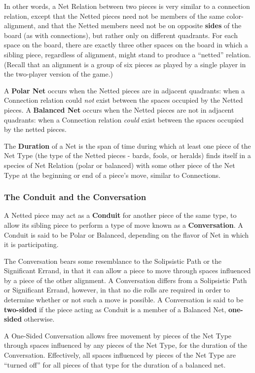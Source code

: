   In other words, a  Net Relation between two pieces is very similar to a
  connection relation, except that the Netted pieces need not be members
  of the same color-alignment, and that the Netted members need not be on opposite
  {\bf sides} of the board (as with connections), but rather only on different
  quadrants. For each space on the board, there are exactly three other
  spaces on the board in which a sibling piece, regardless of alignment,
  might stand to produce a ``netted'' relation.  (Recall that an alignment
  is a group of six pieces as played by a single player in the two-player
  version of the game.)

  A {\bf Polar Net} occurs when the Netted pieces are in adjacent quadrants: when
  a Connection relation could {\sl not} exist between the spaces occupied by the Netted
  pieces.  A {\bf Balanced Net} occurs when the Netted pieces are not in adjacent
  quadrants: when a Connection relation {\sl could} exist between the spaces occupied
  by the netted pieces.

  The {\bf Duration} of a Net is the span of time during which at least one piece of
  the Net Type (the type of the Netted pieces - bards, fools, or heralds) finds itself
  in a species of Net Relation (polar or balanced) with some other piece of the Net
  Type at the beginning or end of a piece's move, similar to Connections.

\subsubsection{The Conduit and the Conversation}\label{conduit}

  A Netted piece may act as a {\bf Conduit} for another piece of the same type, to
  allow its sibling piece to perform a type of move known as a {\bf Conversation}.
  A Conduit is said to be Polar or Balanced, depending on the flavor of Net in
  which it is participating.

  The Conversation bears some resemblance to the Solipsistic Path or the Significant
  Errand, in that it can allow a piece to move through spaces influenced by a 
  piece of the other alignment.  A Conversation differs from a Solipsistic Path or
  Significant Errand, however, in that no die rolls are required in order to
  determine whether or not such a move is possible.  A Conversation is said to be
  {\bf two-sided} if the piece acting as Conduit is a member of a Balanced Net,
  {\bf one-sided} otherwise.

  A One-Sided Conversation allows free movement by pieces of the Net Type 
  through spaces influenced by any pieces of the Net Type, for the duration of the
  Conversation.  Effectively, all spaces influenced by pieces of
  the Net Type are ``turned off'' for all pieces of that type
  for the duration of a balanced net.

